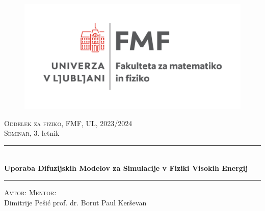 \documentclass[12pt, a4paper]{article}
\begin{document}
\thispagestyle{empty}
\begin{center}

    \begin{figure}[htb!]
        \centering
        \includegraphics[width=0.8\linewidth]{Images/logo_fmf2.png}
    \end{figure}
    \Large{\textsc{Oddelek za fiziko}, FMF, UL, 2023/2024}\\
    \vspace{5mm}
    \huge{\textsc{Seminar}, 3. letnik}\\
    \vspace{5mm}
    \rule{\textwidth}{0.2pt}\\[3mm]
    \LARGE{\textbf{Uporaba Difuzijskih Modelov za Simulacije v Fiziki Visokih Energij}}
    \rule{\textwidth}{0.2pt}

    \vspace{4mm}

    \begin{minipage}[t]{0.90\textwidth}
        \normalsize{\textsc{Avtor:}} \hfill \large{\textsc{Mentor}:}\\
    \large{Dimitrije Pešić} \hfill \large{prof. dr. Borut Paul Ker\v{s}evan}
    \end{minipage}

\end{center}
\end{document}
